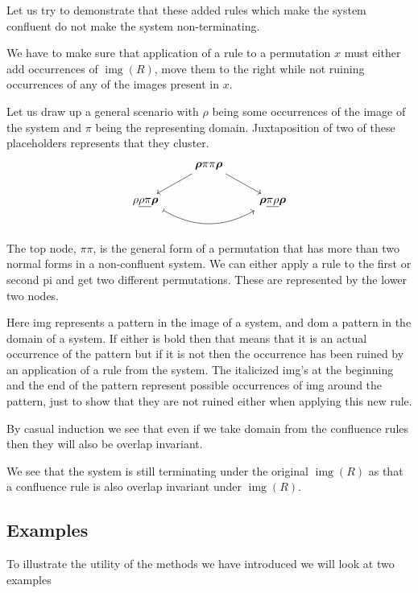 \documentclass[a4paper, 11pt, english]{article}
\theoremstyle{definition}
\DeclareMathOperator{\img}{img}
\begin{document}
Let us try to demonstrate that these added rules which make the system confluent do
not make the system non-terminating.
 
We have to make sure that application of a rule to a permutation $x$ must either add occurrences of $\img(R)$, move them
to the right while not ruining occurrences of any of the images present in $x$.

Let us draw up a general scenario with $\rho$ being some occurrences of the image of the system and
$\pi$ being the representing domain. Juxtaposition of two of these placeholders represents that they
cluster.
\[
\begin{tikzcd}  
    & \bm{\rho}\mathbf{\pi\pi}\bm{\rho} \arrow[dl] \arrow[dr] & \\
    \rho\underline{\mathbf{\rho}\mathrm{\pi}}\bm{\rho} \arrow[bend
    right=30, mapsto]{rr} & & \bm{\rho}\underline{\mathrm{\pi}\mathbf{\rho}}\bm{\rho}
\end{tikzcd}
\]

The top node, $\pi\pi$, is the general form of a permutation that has more than two normal forms in
a non-confluent system. We can either apply a rule to the first or second pi and get two different
permutations. These are represented by the lower two nodes.

Here img represents a pattern in the image of a system, and dom a pattern in the domain of a system.
If either is bold then that means that it is an actual occurrence of the pattern but if it is not
then the occurrence has been ruined by an application of a rule from the system. The italicized
img's at the beginning and the end of the pattern represent possible occurrences of img around the
pattern, just to show that they are not ruined either when applying this new rule.

By casual induction we see that even if we take domain from the confluence rules
then they will also be overlap invariant.

We see that the system is still terminating under the original $\img(R)$ as
that a confluence rule is also overlap invariant under $\img(R)$.

\subsection{Examples}
To illustrate the utility of the methods we have introduced we will look at two
examples
\end{document}
